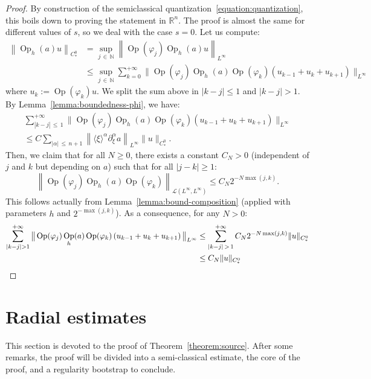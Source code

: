 \documentclass[10pt]{amsart}
\theoremstyle{definition}\newtheorem{defi}[theo]{Definition}\newtheorem{rema}[theo]{Remark}\newtheorem{exam}[theo]{Example}\newtheorem{exem}[theo]{Example}\newtheorem{nota}[theo]{Notation}
\newcommand{\R}{\mathbb{R}}
\newcommand{\N}{\mathbb{N}}
\newcommand{\mc}{\mathcal}
\DeclareMathOperator{\Op}{Op}
\begin{document}
\begin{proof}
By construction of the semiclassical quantization~\eqref{equation:quantization}, this boils down to proving the statement in $\R^n$. The proof is almost the same for different values of $s$, so we deal with the case $s=0$. Let us compute:
\begin{align*}
\left\|\Op_h(a)u\right\|_{C^0_*} & = \sup_{j\,\in\,\N} \left\|\Op(\varphi_j) \Op_h(a)u\right\|_{L^\infty} \\
& \leq \sup_{j\,\in\,\N} \sum_{k=0}^{+\infty}\big\|\Op(\varphi_j) \Op_h(a)\Op(\varphi_k)\left(u_{k-1}+u_k+u_{k+1}\right)\big\|_{L^\infty}
\end{align*}
where $u_k := \Op(\varphi_k)u$. We split the sum above in $|k-j| \leq 1$ and $|k-j| > 1$. By Lemma~\ref{lemma:boundedness-phi}, we have:
\begin{multline*}
\sum_{|k-j|\, \leq\,1}^{+\infty} \big\|\Op(\varphi_j) \Op_h(a)\Op(\varphi_k)\left(u_{k-1}+u_k+u_{k+1}\right)\big\|_{L^\infty} \\
\leq C \sum_{|\alpha|\,\leq\,n+1} \left\|\langle \xi \rangle^\alpha \partial^\alpha_\xi a\right\|_{L^\infty} \|u\|_{C^0_*}.
\end{multline*}
Then, we claim that for all $N \geq 0$, there exists a constant $C_N > 0$ (independent of $j$ and $k$ but depending on $a$) such that for all $|j-k| \geq 1$:
\begin{equation}\label{equation:decroissance-off-diagonal}
\left\|\Op(\varphi_j) \Op_h(a)\Op(\varphi_k)\right\|_{\mc{L}\left(L^\infty,L^\infty\right)} \leq C_N 2^{-N\max(j,k)}.
\end{equation}
This follows actually from Lemma~\ref{lemma:bound-composition} (applied with parameters $h$ and $2^{-\max(j,k)}$). As a consequence, for any $N > 0$:
\begin{align*}
\sum_{|k-j| > 1}^{+\infty} \big\|\Op(\varphi_j) \Op_h(a)\Op(\varphi_k)\left(u_{k-1}+u_k+u_{k+1}\right)\big\|_{L^\infty} & \leq \sum_{|k-j|\,>\, 1}^{+\infty} C_N 2^{-N\max(j,k)} \|u\|_{C^0_*} \\
& \leq C_N \|u\|_{C^0_*}\qedhere
\end{align*}
\end{proof}


\section{Radial estimates}\label{section:estimates}

This section is devoted to the proof of Theorem~\ref{theorem:source}. After some remarks, the proof will be divided into a semi-classical estimate, the core of the proof, and a regularity bootstrap to conclude.
\end{document}
